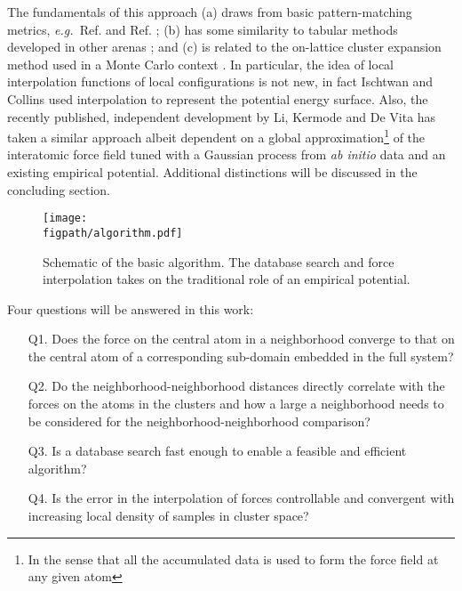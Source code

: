 \documentclass[journal=jctcce,manuscript=article]{achemso}
\newlength{\figwidth}
\newcommand{\figpath}{Figures}
\newcommand{\cref}[1]{{Ref. \citenum{#1}}}
\newcommand{\eg}{{\it e.g.\ }}
\newcommand{\abinitio}{{\it ab initio }}
\begin{document}
The fundamentals of this approach (a) draws from basic pattern-matching metrics, \eg \cref{Gunaratne1995} and \cref{weinberger2009distance}; (b) has some similarity to tabular methods developed in other arenas \cite{Pope1997,Arsenlis2006,Barton2008,ischtwan1994molecular}; and (c) is related to the on-lattice cluster expansion method used in a Monte Carlo context \cite{Sanchez1993,deFontaine1989,Asta1991,Wolverton1991}.
In particular, the idea of local interpolation functions of local configurations is not new, in fact Ischtwan and Collins \cite{ischtwan1994molecular} used interpolation to represent the potential energy surface. 
Also, the recently published, independent development by Li, Kermode and De Vita \cite{li2015molecular} has taken a similar approach albeit dependent on a global approximation\footnote{In the sense that all the accumulated data is used to form the force field at any given atom} of the interatomic force field tuned with a Gaussian process from \abinitio data and an existing empirical potential. 
Additional distinctions will be discussed in the concluding section.

\begin{figure}[h]
\centering
{\texttt{[image: \\figpath/algorithm.pdf]}}
\caption{Schematic of the basic algorithm. The database search and force interpolation takes on the traditional role of an empirical potential.}
\label{fig:algorithm}
\end{figure}


Four questions will be answered in this work:
\begin{enumerate} [itemsep=0pt]
\item[Q1.] Does the force on the central atom in a neighborhood converge to that on the central atom of a corresponding sub-domain embedded in the full system?
\item[Q2.] Do the neighborhood-neighborhood distances directly correlate with the forces on the atoms in the clusters and how a large a neighborhood needs to be considered for the neighborhood-neighborhood comparison?
\item[Q3.] Is a database search fast enough to enable a feasible and efficient algorithm?
\item[Q4.] Is the error in the interpolation of forces controllable and convergent with increasing local density of samples in cluster space?
\end{enumerate}
\end{document}
